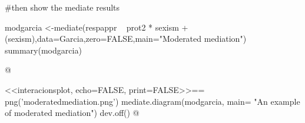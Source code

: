 \documentclass[11pt]{article}
\begin{document}
#then show the mediate results

modgarcia <-mediate(respappr ~ prot2 * sexism +(sexism),data=Garcia,zero=FALSE,main="Moderated mediation")
summary(modgarcia)

@

<<interacionsplot,  echo=FALSE, print=FALSE>>==
png('moderatedmediation.png')
mediate.diagram(modgarcia, main= "An example of moderated mediation")
dev.off()
@
%
%
%
%
%
%
%
%
%
%
%
%
%
%
\end{document}
